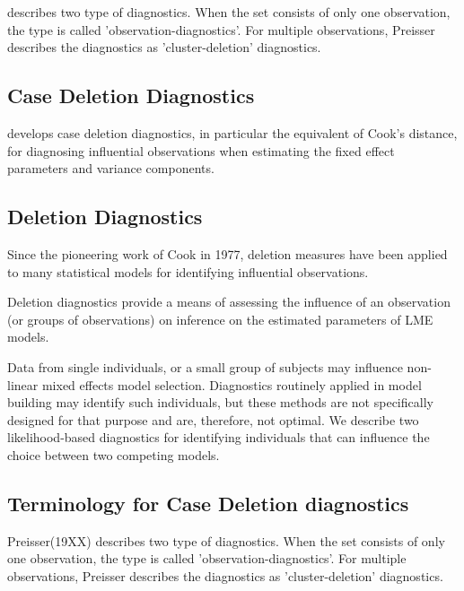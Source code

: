 \documentclass[Chap5amain.tex]{subfiles}
\begin{document}
\citet{preisser} describes two type of diagnostics. When the set consists of only one observation, the type is called
'observation-diagnostics'. For multiple observations, Preisser describes the diagnostics as 'cluster-deletion' diagnostics.


\subsection{Case Deletion Diagnostics} %

\citet{CPJ} develops  case deletion diagnostics, in particular the equivalent of  Cook's distance, for diagnosing influential observations when estimating the fixed effect parameters and variance components.

\subsection{Deletion Diagnostics}

Since the pioneering work of Cook in 1977, deletion measures have been applied to many statistical models for identifying influential observations.

Deletion diagnostics provide a means of assessing the influence of an observation (or groups of observations) on inference on the estimated parameters of LME models.

Data from single individuals, or a small group of subjects may influence non-linear mixed effects model selection. Diagnostics routinely applied in model building may identify such individuals, but these methods are not specifically designed for that purpose and are, therefore, not optimal. We describe two likelihood-based diagnostics for identifying individuals that can influence the choice between two competing models.

%


\subsection{Terminology for Case Deletion diagnostics} %
Preisser(19XX) describes two type of diagnostics. When the set consists of only one observation, the type is called
'observation-diagnostics'. For multiple observations, Preisser describes the diagnostics as 'cluster-deletion' diagnostics.
\end{document}
